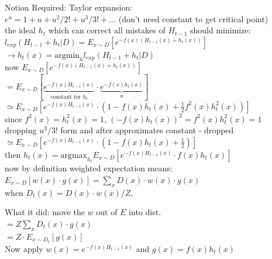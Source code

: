 \documentclass{article}
\begin{document}
Notion Required: Taylor expansion: \\
$e^u = 1 + u + u^2/2! + u^3/3! + \dots$ (don't need constant to get critical point)\\

the ideal $h_t$ which can correct all mistakes of $H_{t-1}$ should minimize: \\

$l_{exp}(H_{t-1} + h_t | D) = E_{x \sim D}[e^{-f(x)(H_{t-1}(x) + h_t(x))}]$ \\

$\rightarrow h_t(x) = \text{argmin}_{h} l_{exp}(H_{t-1} + h_t | D)$ \\

now $E_{x \sim D}[e^{-f(x)(H_{t-1}(x) + h_t(x))}]$ \\

$= E_{x \sim D}[\underbrace{e^{-f(x)H_{t-1}(x)}}_{\text{constant for } h_t} \cdot \underbrace{e^{-f(x)h_t(x)}}_{u}]$ \\

$\simeq E_{x \sim D}[e^{-f(x)H_{t-1}(x)} \cdot (1 - f(x)h_t(x) + \frac{1}{2} f^2(x)h_t^2(x))]$\\

since $f^2(x) = h_t^2(x) = 1$, $(-f(x)h_t(x))^2 = f^2(x)h_t^2(x) = 1$ \\

dropping $u^3/3!$ form and after approximates constant - dropped \\

$\simeq E_{x \sim D}[e^{-f(x)H_{t-1}(x)} \cdot (1 - f(x)h_t(x) + \frac{1}{2})]$ \\

then $h_t(x) = \text{argmax}_{h_t} E_{x \sim D}[e^{-f(x)H_{t-1}(x)} \cdot f(x)h_t(x)]$\\

now by definition weighted expectation means: \\

$E_{x \sim D}[w(x) \cdot g(x)] = \sum_{x} D(x) \cdot w(x) \cdot g(x)$ \\

when $D_t(x) = D(x) \cdot w(x)/Z$,

What it did: move the $w$ out of $E$ into dist. \\

$= Z \sum_{x} D_t(x) \cdot g(x)$ \\

$= Z \cdot E_{x \sim D_t}[g(x)]$\\


Now apply $w(x) = e^{-f(x)H_{t-1}(x)}$ and $g(x) = f(x)h_t(x)$ \\
\end{document}
